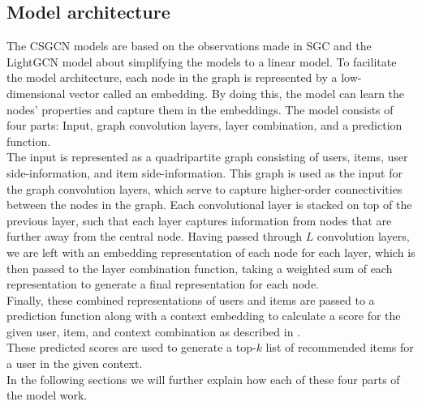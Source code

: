 \subsection{Model architecture}\label{subsec:csgcn_is_model_architecture}
The CSGCN models are based on the observations made in SGC \cite{SimplifyingGCN} and the LightGCN model \cite{LightGCN} about simplifying the models to a linear model.
To facilitate the model architecture, each node in the graph is represented by a low-dimensional vector called an embedding.
By doing this, the model can learn the nodes' properties and capture them in the embeddings.
The model consists of four parts: Input, graph convolution layers, layer combination, and a prediction function.\\
The input is represented as a quadripartite graph consisting of users, items, user side-information, and item side-information.
This graph is used as the input for the graph convolution layers, which serve to capture higher-order connectivities between the nodes in the graph.
Each convolutional layer is stacked on top of the previous layer, such that each layer captures information from nodes that are further away from the central node.
Having passed through $L$ convolution layers, we are left with an embedding representation of each node for each layer, which is then passed to the layer combination function, taking a weighted sum of each representation to generate a final representation for each node.\\
Finally, these combined representations of users and items are passed to a prediction function along with a context embedding to calculate a score for the given user, item, and context combination as described in .\\
These predicted scores are used to generate a top-$k$ list of recommended items for a user in the given context.\\
In the following sections we will further explain how each of these four parts of the model work.




